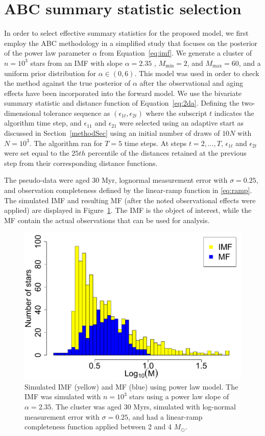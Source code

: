 \documentclass[ejs]{imsart}
\numberwithin{equation}{section}
\theoremstyle{plain}
\newcommand{\Msun}{M_{\odot}}
\newcommand{\Mmax}{M_{\text{max}}}
\newcommand{\Mmin}{M_{\text{min}}}
\begin{document}
\section{ABC summary statistic selection} \label{app:summary}
In order to select effective summary statistics for the proposed model, we first employ the ABC methodology in a simplified study that focuses on the posterior of the power law parameter $\alpha$ from Equation~\eqref{eq:imf}.  We generate a cluster of $n = 10^3$ stars from an IMF with slope $\alpha = 2.35$  \citep{salpeter55}, $\Mmin = 2$, and $\Mmax = 60$,  and a uniform prior distribution for $\alpha \in (0, 6)$.  
%
This  model was used in order to check the method against the true posterior of $\alpha$ after the observational and aging effects have been incorporated into the forward model.  We use the bivariate summary statistic and distance function of Equation~\eqref{eq:2da}.  Defining the two-dimensional tolerance sequence as $(\epsilon_{1t}, \epsilon_{2t})$ where the subscript $t$ indicates the algorithm time step, and  $\epsilon_{11}$ and $\epsilon_{21}$ were selected using an adaptive start as discussed in Section~\ref{methodSec} using an initial number of draws of $10N$ with $N = 10^3$.  The algorithm ran for $T = 5$ time steps.
At steps $t = 2,\ldots,T$, $\epsilon_{1t}$ and $\epsilon_{2t}$ were set equal to the $25th$ percentile of the distances retained at the previous step from their corresponding distance functions.


The pseudo-data were aged 30 Myr, lognormal measurement error with $\sigma = 0.25$, and observation completeness defined by the linear-ramp function in \eqref{eq:ramp}.  The simulated IMF and resulting MF (after the noted observational effects were applied) are displayed in Figure~\ref{fig:abc_simple_data}.  The IMF is the object of interest, while the MF contain the actual observations that can be used for analysis.

\begin{figure}[htbp]
\centering
\includegraphics[width=.5\textwidth]{figures/sim_basic_imf_mf_log10.pdf}       
\caption{Simulated IMF (yellow) and MF (blue) using power law model.  The IMF was simulated with $n = 10^3$ stars using a power law slope of $\alpha = 2.35$.  The cluster was aged 30 Myrs, simulated with log-normal measurement error with $\sigma = 0.25$, and had a linear-ramp completeness function applied between 2 and 4 $\Msun$.
} \label{fig:abc_simple_data}
\end{figure}
\end{document}
